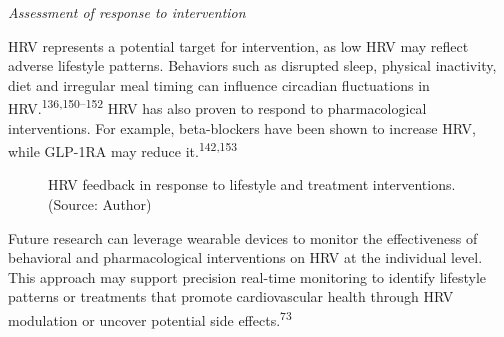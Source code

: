 \documentclass[
  letterpaper,
  headsepline=true,
  open=any]{scrbook}
\begin{document}
\emph{Assessment of response to intervention}

HRV represents a potential target for intervention, as low HRV may
reflect adverse lifestyle patterns. Behaviors such as disrupted sleep,
physical inactivity, diet and irregular meal timing can influence
circadian fluctuations in HRV.\textsuperscript{136,150--152} HRV has
also proven to respond to pharmacological interventions. For example,
beta-blockers have been shown to increase HRV, while GLP-1RA may reduce
it.\textsuperscript{142,153}

\begin{figure}

\begin{minipage}[t]{\linewidth}

{\centering 


\caption{HRV feedback in response to lifestyle and treatment
interventions. (Source: Author)}

}

\end{minipage}%

\end{figure}

Future research can leverage wearable devices to monitor the
effectiveness of behavioral and pharmacological interventions on HRV at
the individual level. This approach may support precision real-time
monitoring to identify lifestyle patterns or treatments that promote
cardiovascular health through HRV modulation or uncover potential side
effects.\textsuperscript{73}
\end{document}
